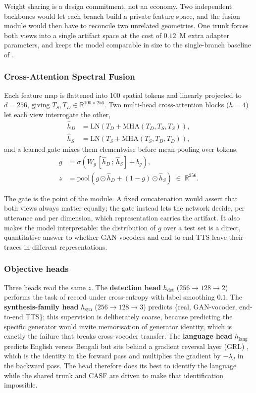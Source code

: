 \documentclass[conference]{IEEEtran}
\renewcommand{\cite}[1]{\unskip}
\begin{document}
Weight sharing is a design commitment, not an economy. Two independent
backbones would let each branch build a private feature space, and the fusion
module would then have to reconcile two unrelated geometries. One trunk forces
both views into a single artifact space at the cost of $0.12$~M extra adapter
parameters, and keeps the model comparable in size to the single-branch
baseline of \cite{ahmed2026melspec}.

\subsubsection{Cross-Attention Spectral Fusion}
Each feature map is flattened into 100 spatial tokens and linearly projected
to $d = 256$, giving $T_S, T_D \in \mathbb{R}^{100 \times 256}$. Two
multi-head cross-attention blocks \cite{vaswani2017attention} ($h = 4$) let
each view interrogate the other,
\begin{align}
\hat{h}_D &= \mathrm{LN}\!\left(T_D + \mathrm{MHA}(T_D, T_S, T_S)\right),\\
\hat{h}_S &= \mathrm{LN}\!\left(T_S + \mathrm{MHA}(T_S, T_D, T_D)\right),
\end{align}
and a learned gate mixes them elementwise before mean-pooling over tokens:
\begin{align}
g &= \sigma\!\left(W_g\,[\hat{h}_D \,;\, \hat{h}_S] + b_g\right),\\
z &= \mathrm{pool}\!\left(g \odot \hat{h}_D + (1 - g) \odot \hat{h}_S\right)
\;\in\; \mathbb{R}^{256}.
\end{align}

The gate is the point of the module. A fixed concatenation would assert that
both views always matter equally; the gate instead lets the network decide,
per utterance and per dimension, which representation carries the artifact. It
also makes the model interpretable: the distribution of $g$ over a test set is
a direct, quantitative answer to whether GAN vocoders and end-to-end TTS leave
their traces in different representations.

\subsubsection{Objective heads}
Three heads read the same $z$. The \textbf{detection head} $h_{\mathrm{det}}$
($256 \rightarrow 128 \rightarrow 2$) performs the task of record under
cross-entropy with label smoothing $0.1$. The \textbf{synthesis-family head}
$h_{\mathrm{syn}}$ ($256 \rightarrow 128 \rightarrow 3$) predicts \{real,
GAN-vocoder, end-to-end TTS\}; this supervision is deliberately coarse,
because predicting the specific generator would invite memorisation of
generator identity, which is exactly the failure that breaks cross-vocoder
transfer. The \textbf{language head} $h_{\mathrm{lang}}$ predicts English
versus Bengali but sits behind a gradient reversal layer (GRL)
\cite{ganin2016dann}, which is the identity in the forward pass and multiplies
the gradient by $-\lambda_d$ in the backward pass. The head therefore does its
best to identify the language while the shared trunk and CASF are driven to
make that identification impossible.
\end{document}
